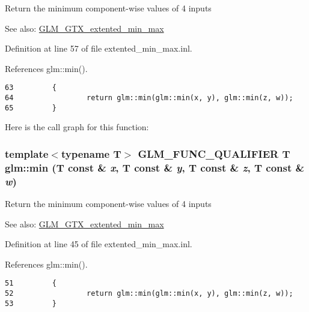 Return the minimum component-wise values of 4 inputs \begin{Desc}
\item[See also:]\hyperlink{group__gtx__extented__min__max}{GLM\_\-GTX\_\-extented\_\-min\_\-max} \end{Desc}


Definition at line 57 of file extented\_\-min\_\-max.inl.

References glm::min().

\begin{Code}\begin{verbatim}63         {
64                 return glm::min(glm::min(x, y), glm::min(z, w));
65         }
\end{verbatim}
\end{Code}




Here is the call graph for this function:\hypertarget{group__gtx__extented__min__max_gdb4c9ecc8ca939f43ba21f8f13a2ad5b}{
\subsubsection[min]{\setlength{\rightskip}{0pt plus 5cm}template$<$typename T$>$ GLM\_\-FUNC\_\-QUALIFIER T glm::min (T const \& {\em x}, \/  T const \& {\em y}, \/  T const \& {\em z}, \/  T const \& {\em w})}}
\label{group__gtx__extented__min__max_gdb4c9ecc8ca939f43ba21f8f13a2ad5b}


Return the minimum component-wise values of 4 inputs \begin{Desc}
\item[See also:]\hyperlink{group__gtx__extented__min__max}{GLM\_\-GTX\_\-extented\_\-min\_\-max} \end{Desc}


Definition at line 45 of file extented\_\-min\_\-max.inl.

References glm::min().

\begin{Code}\begin{verbatim}51         {
52                 return glm::min(glm::min(x, y), glm::min(z, w));
53         }
\end{verbatim}
\end{Code}




